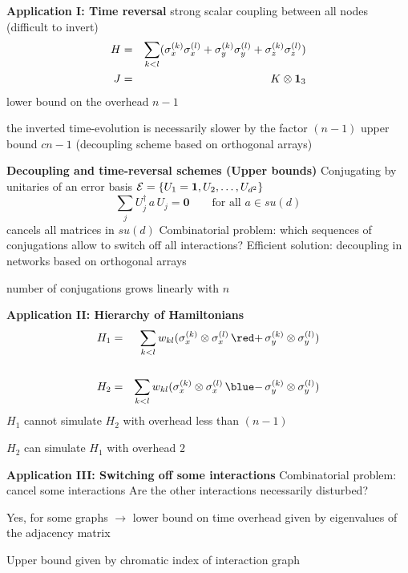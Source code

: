 \documentclass[portrait]{seminar}
\begin{document}
\begin{slide}
{\large {\bf Application I: Time reversal}}
\vfill
strong scalar coupling between all nodes (difficult to invert)
\begin{eqnarray*}
H & = & \sum_{k<l}
(\sigma_x^{(k)}\sigma_x^{(l)} + \sigma_y^{(k)}\sigma_y^{(l)} + 
 \sigma_z^{(k)}\sigma_z^{(l)})\\
J & = & K \otimes {\bf 1}_3
\end{eqnarray*}
\vfill
lower bound on the overhead $n-1$

the inverted time-evolution is necessarily slower by the factor $(n-1)$
\vfill
upper bound $cn-1$ (decoupling scheme based on orthogonal arrays)
\vfill
\end{slide}

\begin{slide}
{\bf Decoupling and time-reversal schemes (Upper bounds)}
\vfill 
Conjugating by unitaries of an {\blue error basis} ${\cal E}=\{U_1={\mathbf
1},U_2,\ldots,U_{d^2}\}$
\[
\sum_j U_j^\dagger\, a\, U_j = {\mathbf 0}\quad\quad
\mbox{for all } a\in su(d)
\]
cancels all matrices in $su(d)$
\vfill
Combinatorial problem: which sequences of conjugations allow to switch off
all interactions?
\vfill
Efficient solution: decoupling in networks based on
{\blue orthogonal arrays} 

number of conjugations grows linearly with $n$
\vfill
\end{slide}

\begin{slide}
{\large {\bf Application II: Hierarchy of Hamiltonians}}
\vfill
\begin{eqnarray*}
H_1 & = & \sum_{k<l} w_{kl} 
(\sigma^{(k)}_x\otimes\sigma^{(l)}_x\, {\red +}\, 
 \sigma^{(k)}_y\otimes\sigma^{(l)}_y) \\
& & \\
H_2 & = & \sum_{k<l} w_{kl} 
(\sigma^{(k)}_x\otimes\sigma^{(l)}_x\, {\blue -}\, 
 \sigma^{(k)}_y\otimes\sigma^{(l)}_y)
\end{eqnarray*}
\vfill
$H_1$ cannot simulate $H_2$ with overhead less than $(n-1)$

$H_2$ can simulate $H_1$ with overhead $2$
\vfill
\end{slide}

\begin{slide}
{\large {\bf Application III: Switching off {\red some} interactions}}
\vfill
Combinatorial problem: cancel some interactions
\vfill
Are the other interactions necessarily disturbed?
\begin{figure}
\centerline{
}
\end{figure}
\vfill 
Yes, for some graphs $\rightarrow$ lower bound on time overhead
given by eigenvalues of the adjacency matrix \vfill

Upper bound given by chromatic index of interaction graph
\end{slide}
\end{document}
